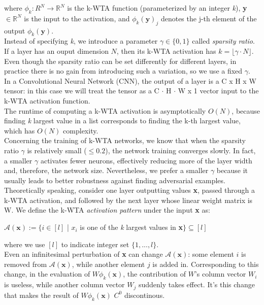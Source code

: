 \documentclass[a4paper]{article}
\begin{document}
where $\phi_{k}: \mathbb{}{R}^{N} \rightarrow \mathbb{R}^{N}$ is the k-WTA function (parameterized by an integer \textit{k}), \textbf{y} $\in \mathbb{R}^{N}$ is the input to the activation, and $\phi_{k}(\textbf{y})_{j}$ denotes the j-th element of the output $\phi_{k}(\textbf{y})$.\\
Instead of specifying \textit{k}, we introduce a parameter $\gamma \in \{0,1\}$ called \emph{sparsity ratio}. If a layer has an ouput dimension $N$, then its k-WTA activation has  $k = \lfloor\gamma \cdot N\rfloor$. Even though the sparsity ratio can be set differently for different layers, in practice there is no gain from introducing such a variation, so we use a fixed $\gamma$.\\
In a Convolutional Neural Network (CNN), the output of a layer is a C x H x W tensor: in this case we will treat the tensor as a C $\cdot$ H $\cdot$ W x 1 vector input to the k-WTA activation function.\\
The runtime of computing a k-WTA activation is asymptotically $O(N)$, because finding \textit{k} largest value in a list corresponds to finding the k-th largest value, which has $O(N)$ complexity.\\
Concerning the training of k-WTA networks, we know that when the sparsity ratio $\gamma$ is relatively small ($\le 0.2$), the network training converges slowly. In fact, a smaller $\gamma$ activates fewer neurons, effectively reducing more of the layer width and, therefore, the network size. Nevertheless, we prefer a smaller $\gamma$ because it usually leads to better robustness against finding adversarial examples.\\
Theoretically speaking, consider one layer outputting values \textbf{x}, passed through  a k-WTA activation, and followed by the next layer whose linear weight matrix is
W. We define the k-WTA \emph{activation pattern} under the input \textbf{x} as:
\begin{center}
$\mathcal{A}(\textbf{x}) := \{i \in [l]$ | $x_{i}$ is one of the \textit{k} largest values in \textbf{x}$\} \subseteq [l]$
\end{center}
where we use $[l]$ to indicate integer set $\{1,...,l\}$.\\
Even an infinitesimal perturbation of \textbf{x} can change $\mathcal{A}(\textbf{x})$: some element $i$ is removed from $\mathcal{A}(\textbf{x})$, while another element $j$ is added in. Corresponding to this change, in the evaluation of $W\phi_{k}(\textbf{x})$, the contribution of $W$'s column vector $W_{i}$ is useless, while another column vector $W_{j}$ suddenly takes effect. It's this change that makes the result of $W\phi_{k}(\textbf{x})$ $C^0$ discontinous.\\
\end{document}
